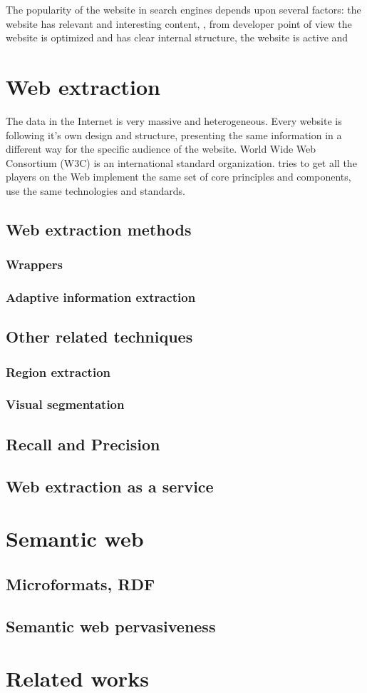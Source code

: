 The popularity of the website in search engines depends upon several factors: the website has relevant and interesting content, , from developer point of view the website is optimized and has clear internal structure, the website is active and 



\section{Web extraction}

The data in the Internet is very massive and heterogeneous. Every website is following it's own design and structure, presenting the same information in a different way for the specific audience of the website. World Wide Web Consortium (W3C) is an international standard organization. tries to get all the players on the Web implement the same set of core principles and components, use the same technologies and standards. 


\subsection{Web extraction methods}
\subsubsection{Wrappers}
\subsubsection{Adaptive information extraction}
\subsection{Other related techniques}
\subsubsection{Region extraction}
\subsubsection{Visual segmentation}
\subsection{Recall and Precision}
\subsection{Web extraction as a service}
\section{Semantic web}
\subsection{Microformats, RDF}
\subsection{Semantic web pervasiveness}
\section{Related works}


